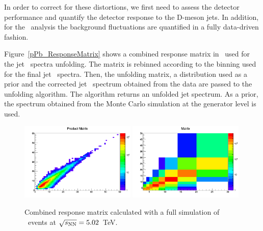 In order to correct for these distortions, we first need to assess the detector performance and quantify
the detector response to the D-meson jets. In addition, for the \pPb\ analysis the background fluctuations are quantified in a
fully data-driven fashion.

Figure~\ref{pPb_ResponseMatrix} shows a combined response matrix in \pPb\, used for the jet \pt\ spectra unfolding.
The matrix is rebinned according to the binning used for the final jet \pt\ spectra. Then, the unfolding matrix, a distribution used as a prior and the corrected jet \pt\ spectrum obtained from the data are passed to the unfolding algorithm. The algorithm returns an unfolded jet \pt spectrum. As a prior, the spectrum obtained from the Monte Carlo simulation at the generator level is used.

\begin{figure}[bth]
\centering
\includegraphics[width=0.49\textwidth]{pPbplots/ResponseMatrix/PythiaRM__Djet5Excl_2_bayes5_weight_MatrixProd}
\includegraphics[width=0.49\textwidth]{pPbplots/ResponseMatrix/PythiaRM__Djet5Excl_2_bayes5_weight_Matrix}
\caption{Combined response matrix calculated with a full simulation of \pPb\ events at $\sqrt{s_{\rm NN}}=5.02$~TeV.}
\label{fig:pPb_ResponseMatrix}
\end{figure}

